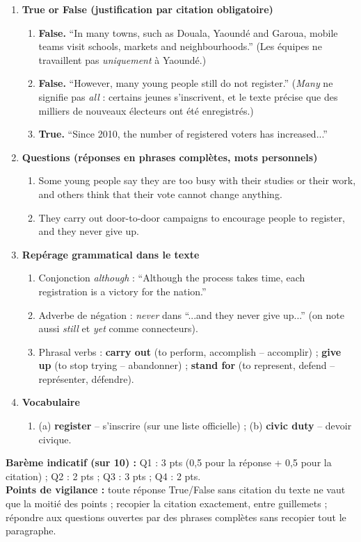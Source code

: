 \documentclass[11pt]{article}
\begin{document}
\begin{corrige}
\begin{enumerate}
\item \textbf{True or False (justification par citation obligatoire)}
\begin{enumerate}
\item \textbf{False.} ``In many towns, such as Douala, Yaoundé and Garoua, mobile teams visit schools, markets and neighbourhoods.'' (Les équipes ne travaillent pas \emph{uniquement} à Yaoundé.)
\item \textbf{False.} ``However, many young people still do not register.'' (\emph{Many} ne signifie pas \emph{all} : certains jeunes s'inscrivent, et le texte précise que des milliers de nouveaux électeurs ont été enregistrés.)
\item \textbf{True.} ``Since 2010, the number of registered voters has increased...''
\end{enumerate}
\item \textbf{Questions (réponses en phrases complètes, mots personnels)}
\begin{enumerate}
\item Some young people say they are too busy with their studies or their work, and others think that their vote cannot change anything.
\item They carry out door-to-door campaigns to encourage people to register, and they never give up.
\end{enumerate}
\item \textbf{Repérage grammatical dans le texte}
\begin{enumerate}
\item Conjonction \emph{although} : ``Although the process takes time, each registration is a victory for the nation.''
\item Adverbe de négation : \emph{never} dans ``...and they never give up...'' (on note aussi \emph{still} et \emph{yet} comme connecteurs).
\item Phrasal verbs : \textbf{carry out} (to perform, accomplish -- accomplir) ; \textbf{give up} (to stop trying -- abandonner) ; \textbf{stand for} (to represent, defend -- représenter, défendre).
\end{enumerate}
\item \textbf{Vocabulaire}
\begin{enumerate}
\item (a) \textbf{register} -- s'inscrire (sur une liste officielle) ; (b) \textbf{civic duty} -- devoir civique.
\end{enumerate}
\end{enumerate}
\textbf{Barème indicatif (sur 10) :} Q1 : 3 pts (0,5 pour la réponse + 0,5 pour la citation) ; Q2 : 2 pts ; Q3 : 3 pts ; Q4 : 2 pts.\\
\textbf{Points de vigilance :} toute réponse True/False sans citation du texte ne vaut que la moitié des points ; recopier la citation exactement, entre guillemets ; répondre aux questions ouvertes par des phrases complètes sans recopier tout le paragraphe.
\end{corrige}
\end{document}
